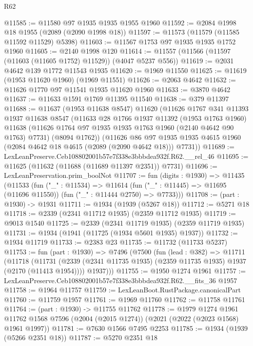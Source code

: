 \begin{lexlean}{R62}
\begin{coremodule}
@11585 := @11580 @97 @1935 @1935 @1955 @1960
@11592 := @2084 @1998 @18 @1955 (@2089 (@2090 @1998 @18))
@11597 := @11573 (@11579 (@11585 @11592 @11529) @5398)
@11603 := @11567 @1753 @97 @1935 @1935 @1752 @1960
@11605 := @2140 @1998 @120
@11614 := @11557 (@11566 (@11597 (@11603 (@11605 @1752) @11529)) (@4047 @5237 @556))
@11619 := @2031 @4642 @139 @1772 @11543 @1935
@11620 := @1969 @11550
@11625 := @11619 (@1953 @11620 @1960) (@1969 @11551)
@11626 := @2063 @4642
@11632 := @11626 @1770 @97 @11541 @1935 @11620 @1960
@11633 := @3870 @4642
@11637 := @11633 @1591 @1769 @11395 @11540
@11638 := @379 @11397
@11688 := @11637
    (@1953 @11638 @8547)
    @11620
    (@11626
      @1767
      @341
      @11393
      @1937
      @11638
      @8547
      (@11633
        @28
        @1766
        @1937
        @11392
        (@1953 @1763 @1960)
        @11638
        (@11626 @1764 @97 @1935 @1935 @1763 @1960 (@2140 @4642 @90 @1763) @7731)
        (@8094 @1762))
      (@11626
        @86
        @97
        @1935
        @1935
        @4615
        @1960
        (@2084 @4642 @18 @4615 (@2089 (@2090 @4642 @18)))
        @7731))
@11689 := LexLeanPreserve.Ceb108802001b57e7f338e3bbbdea932f.R62.__rel_46
@11695 := @11625 (@11632 (@11688 (@11689 @11397 @2351)) @7731)
@11696 := LexLeanPreservation.prim_boolNot
@11707 := fun (digits : @1930) =>
  @11435
    (@11533
      (fun ("_" : @11534) =>
      @11614 (fun ("_" : @11445) => @11695 (@11696 @11550)) (fun ("_" : @11444 @2750) => @7733)))
@11708 := (part : @1930) -> @1931
@11711 := @1934 (@1939 (@5267 @18))
@11712 := @5271 @18
@11718 := @2339 (@2341 @11712 @1935) (@2359 @11712 @1935)
@11719 := @9013 @1540
@11725 := @2339 (@2341 @11719 @1935) (@2359 @11719 @1935)
@11731 := @1934 (@1941 (@11725 (@1934 @5601 @1935) @1937))
@11732 := @1934 @11719
@11733 := @2383 @23
@11735 := @11732 (@11733 @5237)
@11753 := fun (part : @1930) =>
  @7496
    (@7500
      (fun (lead : @382) =>
      @11711
        (@11718
          (@11731 (@2339 (@2341 @11735 @1935) (@2359 @11735 @1935) @1937 (@2170 (@11413 @1954))))
          @1937)))
@11755 := @1950 @1274 @1961
@11757 := LexLeanPreserve.Ceb108802001b57e7f338e3bbbdea932f.R62.__fits_36 @1957
@11758 := @1964 @11757
@11759 := LexLeanBoot.RustPackage.canonicalPart
@11760 := @11759 @1957
@11761 := @1969 @11760
@11762 := @11758 @11761
@11764 := (part : @1930) -> @11755 @11762
@11778 := @1979
    @1274
    @1961
    @11762
    @1568
    @7596
    (@2004 (@2015 @1274))
    (@2021 (@2022 (@2023 @1568) @1961 @1997))
@11781 := @7630 @1566 @7495 @2253
@11785 := @1934 (@1939 (@5266 @2351 @18))
@11787 := @5270 @2351 @18

\end{coremodule}
\end{lexlean}
